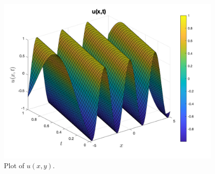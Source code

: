 \documentclass[11pt]{article}
\begin{document}
\begin{enumerate}
\begin{enumerate}[label = (\alph*)]
\begin{figure}[htp]
\begin{center}
  \includegraphics[width=5in]{q4b}
  \caption{Plot of $u(x,y)$.}
  \label{fig:q4b}
  \end{center}
\end{figure}


\end{enumerate}
\end{enumerate}
\end{document}

